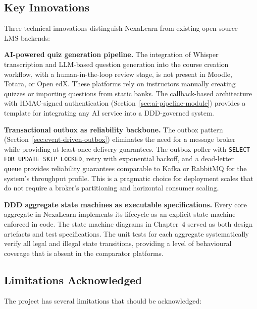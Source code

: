 \subsection{Key Innovations}

Three technical innovations distinguish NexaLearn from existing open-source LMS backends:

\textbf{AI-powered quiz generation pipeline.} The integration of Whisper transcription and LLM-based question generation into the course creation workflow, with a human-in-the-loop review stage, is not present in Moodle, Totara, or Open edX. These platforms rely on instructors manually creating quizzes or importing questions from static banks. The callback-based architecture with HMAC-signed authentication (Section~\ref{sec:ai-pipeline-module}) provides a template for integrating any AI service into a DDD-governed system.

\textbf{Transactional outbox as reliability backbone.} The outbox pattern (Section~\ref{sec:event-driven-outbox}) eliminates the need for a message broker while providing at-least-once delivery guarantees. The outbox poller with \texttt{SELECT FOR UPDATE SKIP LOCKED}, retry with exponential backoff, and a dead-letter queue provides reliability guarantees comparable to Kafka or RabbitMQ for the system's throughput profile. This is a pragmatic choice for deployment scales that do not require a broker's partitioning and horizontal consumer scaling.

\textbf{DDD aggregate state machines as executable specifications.} Every core aggregate in NexaLearn implements its lifecycle as an explicit state machine enforced in code. The state machine diagrams in Chapter~4 served as both design artefacts and test specifications. The unit tests for each aggregate systematically verify all legal and illegal state transitions, providing a level of behavioural coverage that is absent in the comparator platforms.

\subsection{Limitations Acknowledged}

The project has several limitations that should be acknowledged:

